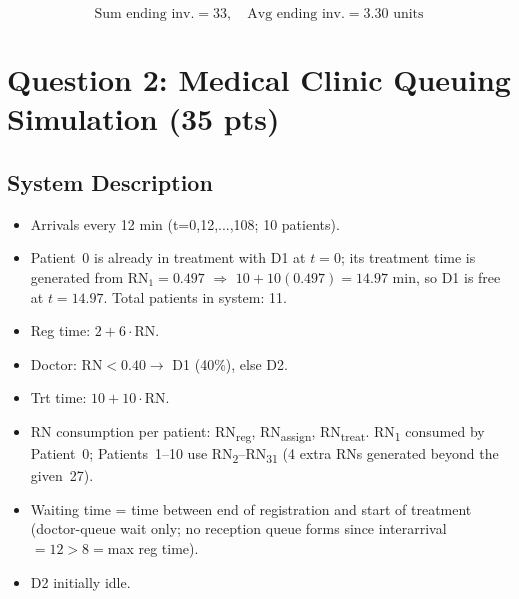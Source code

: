 \documentclass[12pt,a4paper]{article}
\begin{document}
\[
\text{Sum ending inv.} = 33, \quad
\boxed{\text{Avg ending inv.} = 3.30 \text{ units}}
\]

\section{Question 2: Medical Clinic Queuing Simulation (35 pts)}

\subsection{System Description}
\begin{itemize}
  \item Arrivals every 12 min (t=0,12,...,108; 10 patients).
  \item Patient~0 is already in treatment with D1 at $t=0$; its treatment time is generated from $\text{RN}_1=0.497$ $\Rightarrow$ $10+10(0.497)=14.97$ min, so D1 is free at $t=14.97$. Total patients in system: 11.
  \item Reg time: $2 + 6\cdot\text{RN}$.
  \item Doctor: $\text{RN} < 0.40 \to$ D1 (40\%), else D2.
  \item Trt time: $10 + 10\cdot\text{RN}$.
  \item RN consumption per patient: RN\textsubscript{reg}, RN\textsubscript{assign}, RN\textsubscript{treat}. RN\textsubscript{1} consumed by Patient~0; Patients~1--10 use RN\textsubscript{2}--RN\textsubscript{31} (4 extra RNs generated beyond the given~27).
  \item Waiting time = time between end of registration and start of treatment (doctor-queue wait only; no reception queue forms since interarrival${}=12>8={}$max reg time).
  \item D2 initially idle.
\end{itemize}
\end{document}
